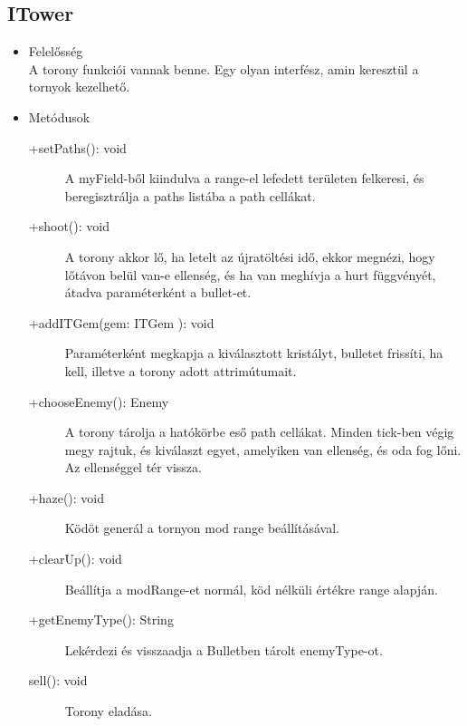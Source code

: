 \subsection{ITower}
\begin{itemize}
\item Felelősség\\
A torony funkciói vannak benne. Egy olyan interfész, amin keresztül a tornyok kezelhető.
\item Metódusok\\
	\begin{description}
		\item[+setPaths(): void] A myField-ből kiindulva a range-el lefedett területen felkeresi, és beregisztrálja a paths listába a path cellákat. 
\item[+shoot(): void] A torony akkor lő, ha letelt az újratöltési idő, ekkor megnézi, hogy lőtávon belül van-e ellenség, és ha van meghívja a hurt függvényét, átadva paraméterként a bullet-et. 
\item[+addITGem(gem: ITGem ): void] Paraméterként megkapja a kiválasztott kristályt, bulletet frissíti, ha kell, illetve a torony adott attrimútumait. 
\item[+chooseEnemy(): Enemy] A torony tárolja a hatókörbe eső path cellákat. Minden tick-ben végig megy rajtuk, és kiválaszt egyet, amelyiken van ellenség, és oda fog lőni. Az ellenséggel tér vissza. 
\item[+haze(): void] Ködöt generál a tornyon mod range beállításával. 
\item[+clearUp(): void] Beállítja a modRange-et normál, köd nélküli értékre range alapján. 
\item[+getEnemyType(): String] Lekérdezi és visszaadja a Bulletben tárolt enemyType-ot.
\item[sell(): void] Torony eladása. 

		
		
	\end{description}
\end{itemize}
